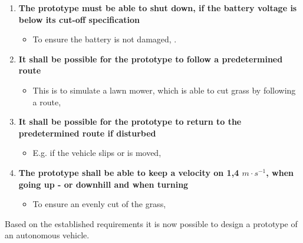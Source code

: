 \begin{enumerate}
\item \textbf{The prototype must be able to shut down, if the battery voltage is below its cut-off specification}
	\begin{itemize}
	\item[] To ensure the battery is not damaged, .
	\end{itemize}
\item \textbf{It shall be possible for the prototype to follow a predetermined route}
	\begin{itemize}
	\item[] This is to simulate a lawn mower, which is able to cut grass by following a route, 
	\end{itemize}
\item \textbf{It shall be possible for the prototype to return to the predetermined route if disturbed}
	\begin{itemize}
	\item[] E.g. if the vehicle slips or is moved, 
	\end{itemize}
\item \textbf{The prototype shall be able to keep a velocity on 1,4 $m \cdot s^{-1}$, when going up - or downhill and when turning}
	\begin{itemize}
	\item[] To ensure an evenly cut of the grass, 
	\end{itemize}
\end{enumerate}

Based on the established requirements it is now possible to design a prototype of an autonomous vehicle.
